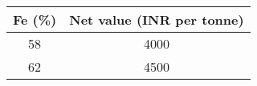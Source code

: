 \begin{center}
  \label{tab:fe-values}
  \begin{tabular}{|c|c|}
    \hline
    \textbf{Fe (\%)} & \textbf{Net value (INR per tonne)} \\ \hline
    58 & 4000 \\ \hline
    62 & 4500 \\ \hline
  \end{tabular}
\end{center}
